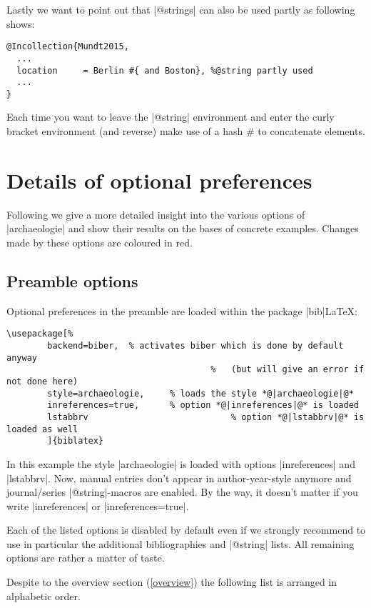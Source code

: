 \documentclass[a4paper,
10pt,
greek,
french,
spanish,
italian,
ngerman,
english
]{ltxdoc}
\begin{document}
Lastly we want to point out that |@strings| can also be used partly as following shows:

\begin{lstlisting}
@Incollection{Mundt2015,
  ...
  location     = Berlin #{ and Boston}, %@string partly used
  ...
}
\end{lstlisting}

Each time you want to leave the |@string| environment and enter the curly bracket environment (and reverse) make use of a hash \# to concatenate elements.  

\section{Details of optional preferences}\label{options-description}
Following we give a more detailed insight into the various options of |archaeologie| 
and show their results on the bases of concrete examples.
Changes made by these options are {\color{red}coloured in red}.

\subsection{Preamble options}\label{options-preamble}
Optional preferences in the preamble are loaded within the package |bib|\LaTeX:
\begin{lstlisting}
\usepackage[%				
		backend=biber,	% activates biber which is done by default anyway 
										%	(but will give an error if not done here)
		style=archaeologie, 	% loads the style *@|archaeologie|@*
		inreferences=true,		% option *@|inreferences|@* is loaded
		lstabbrv							% option *@|lstabbrv|@* is loaded as well
		]{biblatex}
\end{lstlisting}
In this example the style |archaeologie| is loaded with options |inreferences| and |lstabbrv|. 
Now, manual entries don't appear in author-year-style anymore and journal/series |@string|-macros are enabled.
By the way, it doesn't matter if you write |inreferences| or |inreferences=true|.

Each of the listed options is disabled by default even if we strongly recommend to use in particular the additional bibliographies and |@string| lists. All remaining options are rather a matter of taste.

Despite to the overview section (\cref{overview}) the following list is arranged in alphabetic order.
\end{document}
